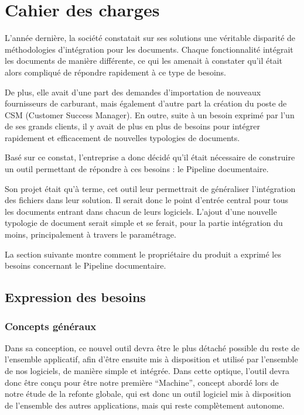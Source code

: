 \chapter{Cahier des charges}\label{ch:cahier}

L'année dernière, la société constatait sur ses solutions une véritable disparité de méthodologies d'intégration pour les documents. Chaque fonctionnalité intégrait les documents de manière différente, ce qui les amenait à constater qu'il était alors compliqué de répondre rapidement à ce type de besoins.

De plus, elle avait d'une part des demandes d'importation de nouveaux fournisseurs de carburant, mais également d'autre part la création du poste de CSM (Customer Success Manager). En outre, suite à un besoin exprimé par l'un de ses grands clients, il y avait de plus en plus de besoins pour intégrer rapidement et efficacement de nouvelles typologies de documents.

Basé sur ce constat, l'entreprise a donc décidé qu'il était nécessaire de construire un outil permettant de répondre à ces besoins : le Pipeline documentaire.

Son projet était qu'à terme, cet outil leur permettrait de généraliser l'intégration des fichiers dans leur solution. Il serait donc le point d'entrée central pour tous les documents entrant dans chacun de leurs logiciels. L'ajout d'une nouvelle typologie de document serait simple et se ferait, pour la partie intégration du moins, principalement à travers le paramétrage.

La section suivante montre comment le propriétaire du produit a exprimé les besoins concernant le Pipeline documentaire.

\section{Expression des besoins}

\subsection{Concepts généraux}

Dans sa conception, ce nouvel outil devra être le plus détaché possible du reste de l'ensemble applicatif, afin d'être ensuite mis à disposition et utilisé par l'ensemble de nos logiciels, de manière simple et intégrée. Dans cette optique, l'outil devra donc être conçu pour être notre première \foreignquote{french}{Machine}, concept abordé lors de notre étude de la refonte globale, qui est donc un outil logiciel mis à disposition de l'ensemble des autres applications, mais qui reste complètement autonome.

